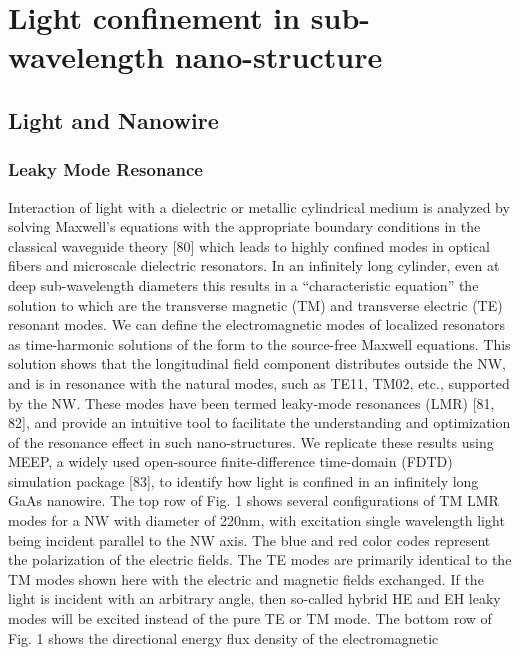 \chapter{Light confinement in sub-wavelength nano-structure} \label{LM}


\section{Light and Nanowire} \label{corrections}


\subsection{Leaky Mode Resonance}
\label{sec:hydrogen}

Interaction of light with a dielectric or metallic cylindrical medium is
analyzed by solving Maxwell's equations with the appropriate boundary
conditions in the classical waveguide theory [80] which leads to highly
confined modes in optical fibers and microscale dielectric resonators. In an
infinitely long cylinder, even at deep sub-wavelength diameters this results in
a “characteristic equation” the solution to which are the transverse magnetic
(TM) and transverse electric (TE) resonant modes. We can define the
electromagnetic modes of localized resonators as time-harmonic solutions of the
form  to the source-free Maxwell equations. This solution shows that the
longitudinal field component distributes outside the NW, and is in resonance
with the natural modes, such as TE11, TM02, etc., supported by the NW. These
modes have been termed leaky-mode resonances (LMR) [81, 82], and provide an
intuitive tool to facilitate the understanding and optimization of the
resonance effect in such nano-structures.  We replicate these results using
MEEP, a widely used open-source finite-difference time-domain (FDTD) simulation
package [83], to identify how light is confined in an infinitely long GaAs
nanowire. The top row of Fig. 1 shows several configurations of TM LMR modes
for a NW with diameter of 220nm, with excitation single wavelength light being
incident parallel to the NW axis. The blue and red color codes represent the
polarization of the electric fields. The TE modes are primarily identical to
the TM modes shown here with the electric and magnetic fields exchanged. If the
light is incident with an arbitrary angle, then so-called hybrid HE and EH
leaky modes will be excited instead of the pure TE or TM mode.  The bottom row
of Fig. 1 shows the directional energy flux density of the electromagnetic

